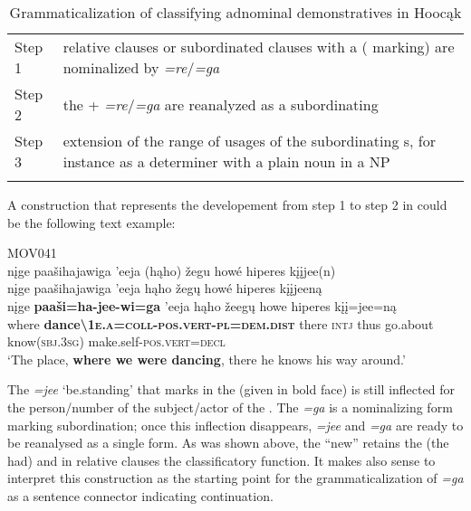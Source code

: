 \documentclass[output=paper]{langsci/langscibook}
\begin{document}
\begin{table}
\begin{tabularx}{\textwidth}{lQ}
\lsptoprule
Step 1 & relative clauses or subordinated clauses with a  ( marking) are nominalized by \textit{=re}\slash \textit{=ga}\\
\tablevspace
Step 2 & the  + \textit{=re}\slash \textit{=ga} are reanalyzed as a subordinating \\
\tablevspace
Step 3 & extension of the range of usages of the subordinating s, for instance as a determiner with a plain noun in a NP \\
\lspbottomrule
\end{tabularx}
\caption{Grammaticalization of classifying adnominal demonstratives in Hoocąk}
\label{tab:helmbrecht:16}
\end{table}
 

A construction that represents the developement from step 1 to step 2 in  could be the following text example:\newpage

 \ea \label{ex:helmbrecht:18}
MOV041\\
\gllll nįge paašihajawiga 'eeja                (hąho) žegu                                                                                           howé hiperes kįįjee(n) ~ ~\\
	nįge paašihajawiga 'eeja                hąho žegų                                                                                            howé hiperes kįįjeeną\\
	nįge \textbf{paaši=ha-jee-wi=ga} 'eeja  hąho žeegų                                                                                           howe hiperes kįį=jee=ną\\
	where \textbf{dance{\textbackslash}}\textbf{\textsc{1e.a}=\textsc{coll}-\textsc{pos}.\textsc{vert}-\textsc{pl}=\textsc{dem}.\textsc{dist}} there \textsc{intj} thus    go.about   know(\textsc{sbj}.\textsc{3sg}) make.self-\textsc{pos}.\textsc{vert}=\textsc{decl}\\
\glt `The place, \textbf{where we were dancing}, there he knows his way around.'
\z

The  \textit{=jee} `be.standing' that marks  in the  (given in bold face) is still inflected for the person\slash number of the subject\slash actor of the . The  \textit{=ga} is a nominalizing form marking subordination; once this inflection disappears, \textit{=jee} and \textit{=ga} are ready to be reanalysed as a single form. As was shown above, the ``new''  retains the   (the  had) and in relative clauses the classificatory function. It makes also sense to interpret this construction as the starting point for the grammaticalization of \textit{=ga} as a sentence connector indicating continuation.
\end{document}
